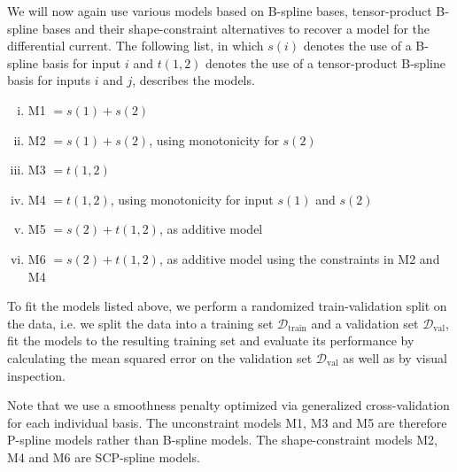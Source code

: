 We will now again use various models based on B-spline bases, tensor-product B-spline bases and their shape-constraint alternatives to recover a model for the differential current. The following list, in which $s(i)$ denotes the use of a B-spline basis for input $i$ and $t(1,2)$ denotes the use of a tensor-product B-spline basis for inputs $i$ and $j$, describes the models.

\begin{enumerate}[(i)]
	\item M1 $= s(1) + s(2)$
	\item M2 $= s(1) + s(2)$, using monotonicity for $s(2)$
	\item M3 $= t(1,2)$
	\item M4 $= t(1,2)$, using monotonicity for input $s(1)$ and $s(2)$
	\item M5 $= s(2) + t(1,2)$, as additive model 
	\item M6 $= s(2) + t(1,2)$, as additive model using the constraints in M2 and M4
\end{enumerate}
%
To fit the models listed above, we perform a randomized train-validation split on the data, i.e. we split the data into a training set $\mathcal{D}_{\text{train}}$ and a validation set $\mathcal{D}_{\text{val}}$, fit the models to the resulting training set and evaluate its performance by calculating the mean squared error on the validation set $\mathcal{D}_{\text{val}}$ as well as by visual inspection.


Note that we use a smoothness penalty optimized via generalized cross-validation for each individual basis. The unconstraint models M1, M3 and M5 are therefore P-spline models rather than B-spline models. The shape-constraint models M2, M4 and M6 are SCP-spline models. 


